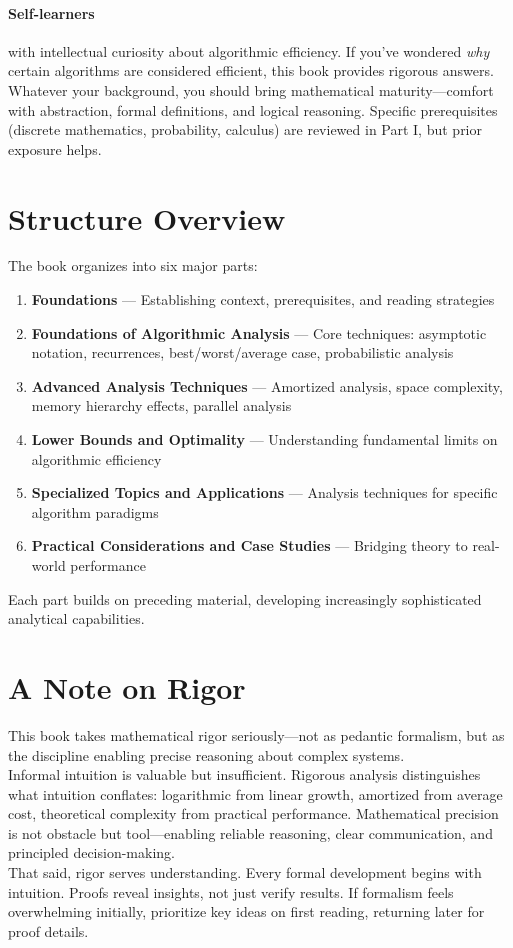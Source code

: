 \paragraph{Self-learners} with intellectual curiosity about algorithmic efficiency. If you've wondered \textit{why} certain algorithms are considered efficient, this book provides rigorous answers.\\
Whatever your background, you should bring mathematical maturity—comfort with abstraction, formal definitions, and logical reasoning. Specific prerequisites (discrete mathematics, probability, calculus) are reviewed in Part I, but prior exposure helps.


\section*{Structure Overview}

The book organizes into six major parts:

\begin{enumerate}
	\item \textbf{Foundations} — Establishing context, prerequisites, and reading strategies
	\item \textbf{Foundations of Algorithmic Analysis} — Core techniques: asymptotic notation, recurrences, best/worst/average case, probabilistic analysis
	\item \textbf{Advanced Analysis Techniques} — Amortized analysis, space complexity, memory hierarchy effects, parallel analysis
	\item \textbf{Lower Bounds and Optimality} — Understanding fundamental limits on algorithmic efficiency
	\item \textbf{Specialized Topics and Applications} — Analysis techniques for specific algorithm paradigms
	\item \textbf{Practical Considerations and Case Studies} — Bridging theory to real-world performance
\end{enumerate}
Each part builds on preceding material, developing increasingly sophisticated analytical capabilities.

\section*{A Note on Rigor}

This book takes mathematical rigor seriously—not as pedantic formalism, but as the discipline enabling precise reasoning about complex systems.\\
Informal intuition is valuable but insufficient. Rigorous analysis distinguishes what intuition conflates: logarithmic from linear growth, amortized from average cost, theoretical complexity from practical performance. Mathematical precision is not obstacle but tool—enabling reliable reasoning, clear communication, and principled decision-making.\\
That said, rigor serves understanding. Every formal development begins with intuition. Proofs reveal insights, not just verify results. If formalism feels overwhelming initially, prioritize key ideas on first reading, returning later for proof details.


